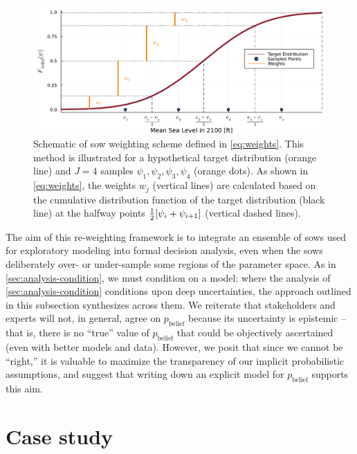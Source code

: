 \documentclass[11pt]{article}
\begin{document}
\begin{figure}
    \centering
    \includegraphics[width=\textwidth]{grid-sketch}
    \caption{
        Schematic of \gls{sow} weighting scheme defined in \cref{eq:weights}.
        This method is illustrated for a hypothetical target distribution (orange line) and $J=4$ samples $\psi_1, \psi_2, \psi_3, \psi_4$ (orange dots).
        As shown in \cref{eq:weights}, the weights $w_j$ (vertical lines) are calculated based on the cumulative distribution function of the target distribution  (black line) at the halfway points $\frac{1}{2}\qty[\psi_i+\psi_{i+1}]$ (vertical dashed lines).
    }\label{fig:grid-sketch}
\end{figure}

The aim of this re-weighting framework is to integrate an ensemble of \glspl{sow} used for exploratory modeling into formal decision analysis, even when the \glspl{sow} deliberately over- or under-sample some regions of the parameter space.
As in \cref{sec:analysis-condition}, we must condition on a model: where the analysis of \cref{sec:analysis-condition} conditions upon deep uncertainties, the approach outlined in this subsection synthesizes across them.
We reiterate that stakeholders and experts will not, in general, agree on $p_\mathrm{belief}$ because its uncertainty is epistemic -- that is, there is no ``true'' value of $p_\mathrm{belief}$ that could be objectively ascertained (even with better models and data).
However, we posit that since we cannot be ``right,'' it is valuable to maximize the transparency of our implicit probabilistic assumptions, and suggest that writing down an explicit model for $p_\mathrm{belief}$ supports this aim.

\section{Case study}\label{sec:case-study}
\end{document}
